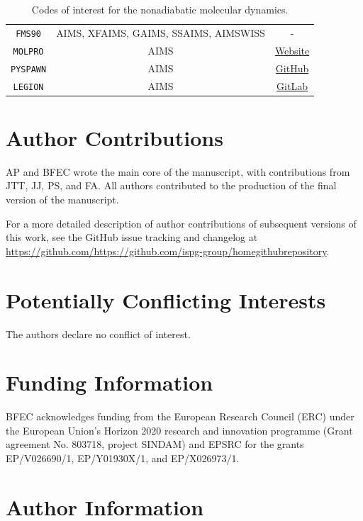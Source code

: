 \documentclass[9pt,bestpractices]{livecoms}
\newcommand{\githubrepository}{\url{https://github.com/https://github.com/ispg-group/homegithubrepository}}  %
\begin{document}
\begin{table}[h!]
\begin{tabular}{|c|c|c|}
        \texttt{FMS90} & AIMS, XFAIMS, GAIMS, SSAIMS, AIMSWISS  & - \\ 
        \texttt{MOLPRO} & AIMS & \href{https://www.molpro.net}{Website} \\
        \texttt{PYSPAWN} & AIMS  & \href{https://github.com/blevine37/pySpawn17}{GitHub} \\ 
        \texttt{LEGION} & AIMS  & \href{https://gitlab.com/light-and-molecules/legion}{GitLab} \\  
    \hline
    \end{tabular}
    \caption{Codes of interest for the nonadiabatic molecular dynamics.}
    \label{tab:NAMD}
\end{table}

\clearpage

\section*{Author Contributions}


AP and BFEC wrote the main core of the manuscript, with contributions from JTT, JJ, PS, and FA. All authors contributed to the production of the final version of the manuscript.

For a more detailed description of author contributions of subsequent versions of this work, see the GitHub issue tracking and changelog at \githubrepository.


\section*{Potentially Conflicting Interests}

The authors declare no conflict of interest. 

\section*{Funding Information}

BFEC acknowledges funding from the European Research Council (ERC) under the European Union's Horizon 2020 research and innovation programme (Grant agreement No. 803718, project SINDAM) and EPSRC for the grants EP/V026690/1, EP/Y01930X/1, and EP/X026973/1.

\section*{Author Information}
\makeorcid

\end{document}
